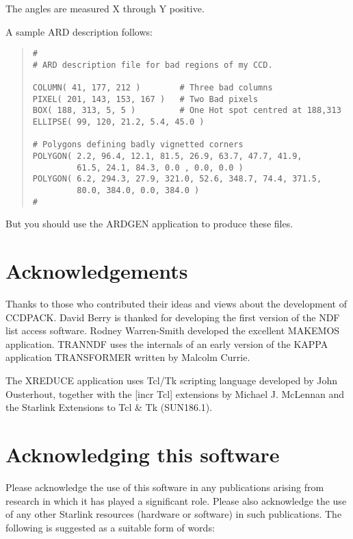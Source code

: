\documentclass[twoside,11pt]{article}
\newcommand{\htmladdnormallink}[2]{#1}
\newcommand{\htmlref}[2]{#1}
\newcommand{\xref}[3]{#1}
\renewcommand{\_}{\texttt{\symbol{95}}}
\newenvironment{myquote}{\begin{quote}\begin{small}}{\end{small}\end{quote}}
\newcommand{\xroutine}[1]{\htmlref{{\sc #1}}{#1}}
\begin{document}
The angles are measured X through Y positive.

A sample ARD description follows:
\begin{myquote}
\begin{verbatim}
#
# ARD description file for bad regions of my CCD.

COLUMN( 41, 177, 212 )        # Three bad columns
PIXEL( 201, 143, 153, 167 )   # Two Bad pixels
BOX( 188, 313, 5, 5 )         # One Hot spot centred at 188,313
ELLIPSE( 99, 120, 21.2, 5.4, 45.0 )

# Polygons defining badly vignetted corners
POLYGON( 2.2, 96.4, 12.1, 81.5, 26.9, 63.7, 47.7, 41.9,
         61.5, 24.1, 84.3, 0.0 , 0.0, 0.0 )
POLYGON( 6.2, 294.3, 27.9, 321.0, 52.6, 348.7, 74.4, 371.5,
         80.0, 384.0, 0.0, 384.0 )
#
\end{verbatim}
\end{myquote}

But you should use the \xref{ARDGEN}{sun95}{ARDGEN} application to
produce these files.

\section{Acknowledgements}

Thanks to those who contributed their ideas and views about the
development of CCDPACK. David Berry is thanked for developing the
first version of the NDF list access software. Rodney Warren-Smith
developed the excellent \xroutine{MAKEMOS}
application. \xroutine{TRANNDF} uses the internals of an early version
of the KAPPA application \xref{TRANSFORMER}{sun95}{TRANSFORMER}
written by Malcolm Currie.

The \xroutine{XREDUCE} application uses
\htmladdnormallink{Tcl/Tk}{http://www.scriptics.com/}
scripting language developed by John Ousterhout, together with the
\htmladdnormallink{[incr Tcl]}{http://www.tcltk.com/itcl} extensions
by Michael J. McLennan and the
\xref{Starlink Extensions to Tcl \& Tk}{sun186}{} (SUN186.1).

\section{Acknowledging this software}
Please acknowledge the use of this software in any publications arising
from research in which it has played a significant role. Please also
acknowledge the use of any other Starlink resources (hardware or
software) in such publications. The following is suggested as a suitable
form of words:
\end{document}
